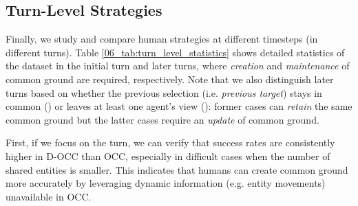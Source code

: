 \begin{table}[t!]
\centering {}
\caption{\label{06_tab:turn_level_utterances}
Comparison of utterances when the previous target stays in common (\cmark) or not (\xmark).
}
\end{table}

\subsection{Turn-Level Strategies}
\label{06_subsec:turn_level_strategies}

Finally, we study and compare human strategies at different timesteps (in different turns). Table \ref{06_tab:turn_level_statistics} shows detailed statistics of the dataset in the initial turn and later turns, where \textit{creation} and \textit{maintenance} of common ground are required, respectively. Note that we also distinguish later turns based on whether the previous selection (i.e. \textit{previous target}) stays in common (\cmark) or leaves at least one agent's view (\xmark): former cases can \textit{retain} the same common ground but the latter cases require an \textit{update} of common ground.

First, if we focus on the  turn, we can verify that success rates are consistently higher in D-OCC than OCC, especially in difficult cases when the number of shared entities is smaller. This indicates that humans can create common ground more accurately by leveraging dynamic information (e.g. entity movements) unavailable in OCC.

